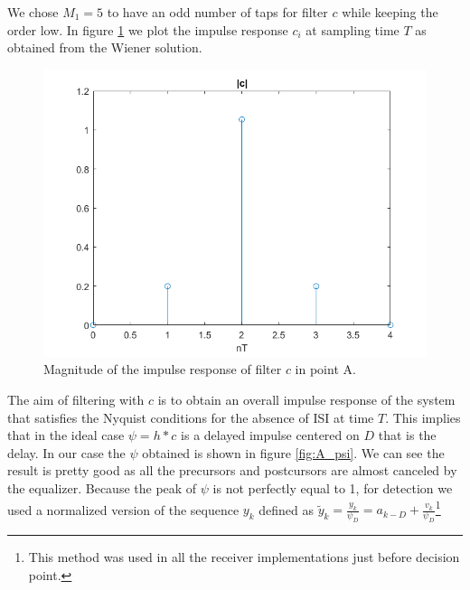 \documentclass[a4paper,11.5pt]{article}
\begin{document}
We chose $M_1=5$ to have an odd number of taps for filter $c$ while keeping the order low.
In figure \ref{fig:A_c} we plot the impulse response $c_i$ at sampling time $T$ as obtained from the Wiener solution. 

\begin{figure}[H]
	\begin{center}   
		\includegraphics[width=\textwidth]{figs/A_c.png} 
		\caption{Magnitude of the impulse response of filter $c$ in point A.}
		\label{fig:A_c}
	\end{center}
\end{figure}

The aim of filtering with $c$ is to obtain an overall impulse response of the system that satisfies the Nyquist conditions for the absence of ISI at time $T$. This implies that in the ideal case $\psi=h*c$ is a delayed impulse centered on $D$ that is the delay. In our case the $\psi$ obtained is shown in figure \ref{fig:A_psi}. We can see the result is pretty good as all the precursors and postcursors are almost canceled by the equalizer. Because the peak of $\psi$ is not perfectly equal to 1, for detection we used a normalized version of the sequence $y_k$ defined as $\tilde{y}_k=\frac{y_k}{\psi_D}=a_{k-D} + \frac{v_k}{\psi_D}$\footnote{This method was used in all the receiver implementations just before decision point.}
\end{document}
